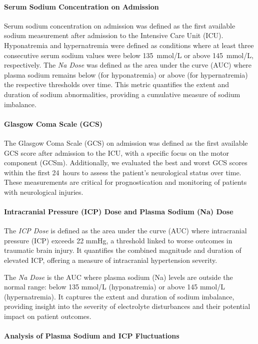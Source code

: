 \paragraph{Serum Sodium Concentration on Admission}

Serum sodium concentration on admission was defined as the first available sodium measurement after admission to the Intensive Care Unit (ICU). Hyponatremia and hypernatremia were defined as conditions where at least three consecutive serum sodium values were below 135~mmol/L or above 145~mmol/L, respectively. The \textit{Na Dose} was defined as the area under the curve (AUC) where plasma sodium remains below (for hyponatremia) or above (for hypernatremia) the respective thresholds over time. This metric quantifies the extent and duration of sodium abnormalities, providing a cumulative measure of sodium imbalance.

\paragraph{Glasgow Coma Scale (GCS)}

The Glasgow Coma Scale (GCS) on admission was defined as the first available GCS score after admission to the ICU, with a specific focus on the motor component (GCSm). Additionally, we evaluated the best and worst GCS scores within the first 24~hours to assess the patient's neurological status over time. These measurements are critical for prognostication and monitoring of patients with neurological injuries.

\paragraph{Intracranial Pressure (ICP) Dose and Plasma Sodium (Na) Dose}
The \textit{ICP Dose} is defined as the area under the curve (AUC) where intracranial pressure (ICP) exceeds 22 mmHg, a threshold linked to worse outcomes in traumatic brain injury. It quantifies the combined magnitude and duration of elevated ICP, offering a measure of intracranial hypertension severity.

The \textit{Na Dose} is the AUC where plasma sodium (Na) levels are outside the normal range: below 135 mmol/L (hyponatremia) or above 145 mmol/L (hypernatremia). It captures the extent and duration of sodium imbalance, providing insight into the severity of electrolyte disturbances and their potential impact on patient outcomes.


\paragraph{Analysis of Plasma Sodium and ICP Fluctuations}

